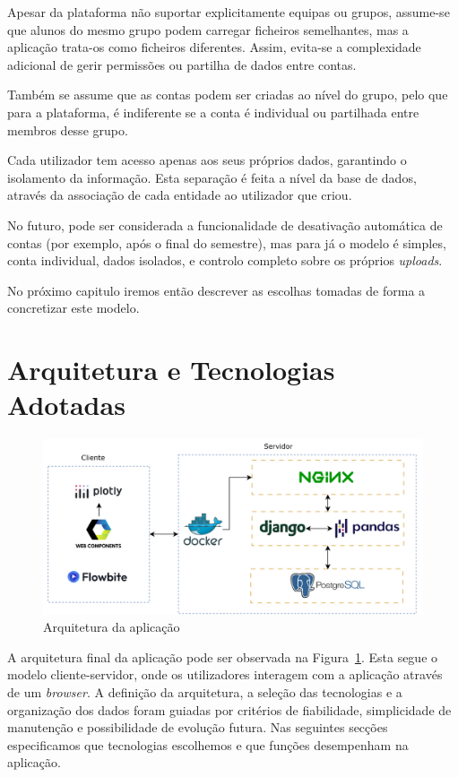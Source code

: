 Apesar da plataforma não suportar explicitamente equipas ou grupos, assume-se que alunos do mesmo grupo podem carregar ficheiros semelhantes, mas a aplicação trata-os como ficheiros diferentes. Assim, evita-se a complexidade adicional de gerir permissões ou partilha de dados entre contas. 

Também se assume que as contas podem ser criadas ao nível do grupo, pelo que para a plataforma, é indiferente se a conta é individual ou partilhada entre membros desse grupo.

Cada utilizador tem acesso apenas aos seus próprios dados, garantindo o isolamento da informação. Esta separação é feita a nível da base de dados, através da associação de cada entidade ao utilizador que criou.

No futuro, pode ser considerada a funcionalidade de desativação automática de contas (por exemplo, após o final do semestre), mas para já o modelo é simples, conta individual, dados isolados, e controlo completo sobre os próprios \textit{uploads}.

No próximo capitulo iremos então descrever as escolhas tomadas de forma a concretizar este modelo.

\section{Arquitetura e Tecnologias Adotadas}
\label{sec:tec}

\begin{figure}[h]
\centering
\includegraphics[max width=\textwidth]{./img/arch}
\caption{Arquitetura da aplicação}
\label{fig:arquitectura}
\end{figure}

A arquitetura final da aplicação pode ser observada na Figura~\ref{fig:arquitectura}. Esta segue o modelo cliente-servidor, onde os utilizadores interagem com a aplicação através de um \textit{browser}. A definição da arquitetura, a seleção das tecnologias e a organização dos dados foram guiadas por critérios de fiabilidade, simplicidade de manutenção e possibilidade de evolução futura.  Nas seguintes secções especificamos que tecnologias escolhemos e que funções desempenham na aplicação.

